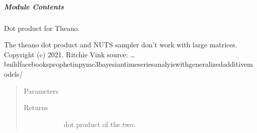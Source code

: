 \documentclass[letterpaper,10pt,english]{sphinxmanual}
\begin{document}
\subparagraph{Module Contents}
\label{\detokenize{autoapi/src/model/model/index:module-contents}}

\begin{fulllineitems}
\label{\detokenize{autoapi/src/model/model/index:src.model.model.logger}}
\end{fulllineitems}


\begin{fulllineitems}
\label{\detokenize{autoapi/src/model/model/index:src.model.model.det_dot}}
Dot product for Theano.

The theano dot product and NUTS sampler don’t work with large matrices.
Copyright (c) 2021. Ritchie Vink
source:  …
build\sphinxhyphen{}facebooks\sphinxhyphen{}prophet\sphinxhyphen{}in\sphinxhyphen{}pymc3\sphinxhyphen{}bayesian\sphinxhyphen{}time\sphinxhyphen{}series\sphinxhyphen{}analyis\sphinxhyphen{}with\sphinxhyphen{}generalized\sphinxhyphen{}additive\sphinxhyphen{}models/
\begin{quote}\begin{description}
\item[{Parameters}] \leavevmode\begin{description}
\item[{}] \leavevmode{[}\sphinxcode{\sphinxupquote{np.array}}{]}
\item[{}] \leavevmode{[}\sphinxcode{\sphinxupquote{tt.vector}}{]}
\end{description}

\item[{Returns}] \leavevmode\begin{description}
\item[{}] \leavevmode
dot product of the two.

\end{description}

\end{description}\end{quote}

\end{fulllineitems}
\end{document}
